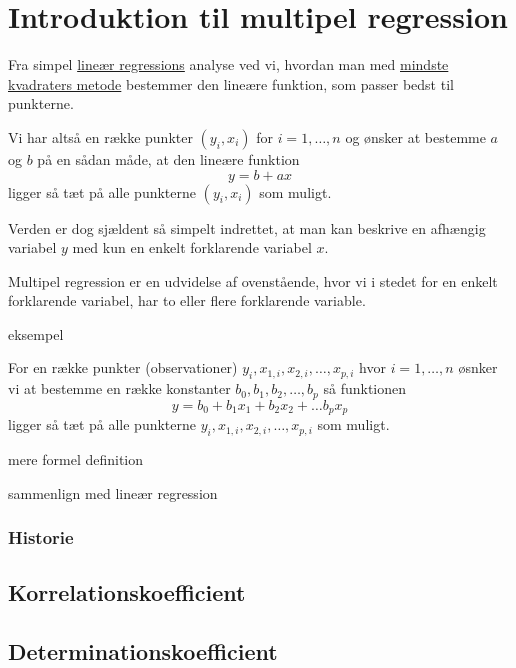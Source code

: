 \documentclass[11pt, a4paper]{article}
\begin{document}
\section{Introduktion til multipel regression}

Fra simpel \href{http://www.webmatematik.dk/lektioner/matematik-b/regression}{lineær
regressions} analyse ved vi, hvordan man med
\href{http://www.webmatematik.dk/lektioner/matematik-b/regression}{mindste kvadraters metode}
bestemmer den lineære funktion, som passer bedst til punkterne.

Vi har altså en række punkter \((y_i, x_i)\) for \(i=1,\ldots,n\) og ønsker at bestemme
\(a\) og \(b\) på en sådan måde, at den lineære funktion
\begin{displaymath}
  y = b + a x
\end{displaymath}
ligger så tæt på alle punkterne \((y_i, x_i)\) som muligt.

Verden er dog sjældent så simpelt indrettet, at man kan beskrive en afhængig variabel \(y\)
med kun en enkelt forklarende variabel \(x\).

Multipel regression er en udvidelse af ovenstående, hvor vi i stedet for en enkelt forklarende
variabel, har to eller flere forklarende variable.

eksempel

For en række punkter (observationer) \(y_i,x_{1,i},x_{2,i},\ldots,x_{p,i}\) hvor \(i=1,\ldots,n\) øsnker vi
at bestemme en række konstanter \(b_0,b_1,b_2,\ldots,b_p\) så funktionen
\begin{displaymath}
  y = b_0 + b_1 x_1 + b_2 x_2 + \dots b_p x_p
\end{displaymath}
ligger så tæt på alle punkterne \(y_i,x_{1,i},x_{2,i},\ldots,x_{p,i}\) som muligt.


mere formel definition

sammenlign med lineær regression

\subsubsection{Historie}


\subsection{Korrelationskoefficient}

\subsection{Determinationskoefficient}
\end{document}
